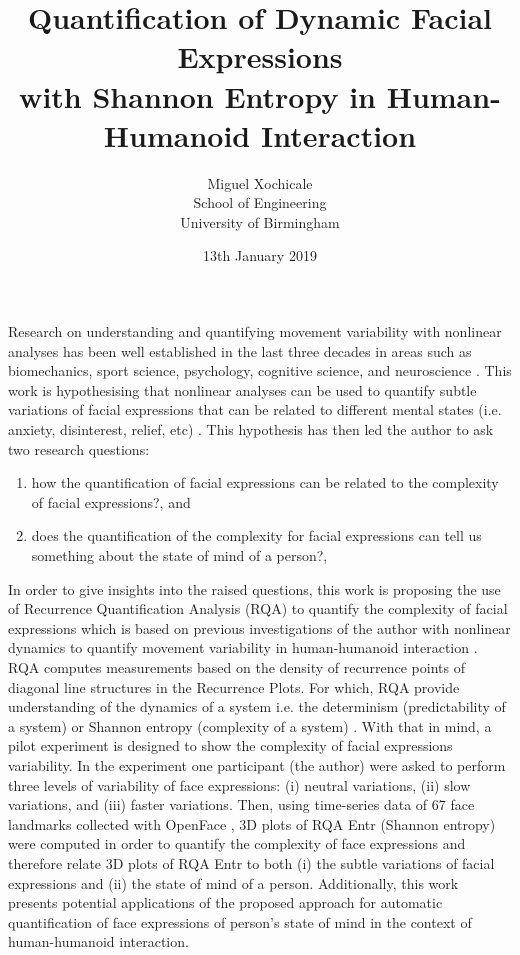 \documentclass[12pt]{article}
\title{
Quantification of Dynamic Facial Expressions \\
with Shannon Entropy
in Human-Humanoid Interaction
}
\author{Miguel Xochicale \\
School of Engineering \\
University of Birmingham}
\date{13th January 2019}
\begin{document}
\maketitle
\thispagestyle{empty} %

Research on understanding and quantifying movement variability 
with nonlinear analyses has been well established in the last three 
decades in areas such as biomechanics, sport science, psychology, 
cognitive science, and neuroscience \cite{davids2003}.
This work is hypothesising that nonlinear analyses 
can be used to quantify subtle variations of facial expressions 
that can be related to different mental states 
(i.e. anxiety, disinterest, relief, etc) \cite{back2014}.
This hypothesis has then led the author to ask two research questions: 
\begin{enumerate}[label=(\roman*)]
\item how the quantification of facial expressions can be related to  
	the complexity of facial expressions?, and 
\item does the quantification of the complexity for facial expressions 
	can tell us something about the state of mind of a person?, 
\end{enumerate}


In order to give insights into the raised questions,
this work is proposing 
the use of Recurrence Quantification Analysis (RQA) 
to quantify the complexity of facial expressions 
which is based on previous investigations of the author 
with nonlinear dynamics to quantify movement variability 
in human-humanoid interaction \cite{XochicalePhDThesis2018}.
RQA computes measurements based on the density of 
recurrence points of diagonal line 
structures in the Recurrence Plots.
For which, RQA provide understanding of the dynamics of a system i.e. 
the determinism (predictability of a system) or 
Shannon entropy (complexity of a system) \cite{marwan2007}.
With that in mind, a pilot experiment is designed 
to show the complexity of facial expressions variability. 
In the experiment one participant (the author) 
were asked to perform 
three levels of variability of face expressions:
(i) neutral variations, (ii) slow variations, and (iii) faster variations.
Then, using time-series data of 67 face landmarks collected 
with OpenFace \cite{baltrusaitis2018}, 3D plots
of RQA Entr (Shannon entropy) were computed in order
to quantify the complexity of face expressions and 
therefore relate 3D plots of RQA Entr 
to both (i) the subtle variations of facial expressions 
and (ii) the state of mind of a person. Additionally,
this work presents potential applications of the proposed 
approach for automatic quantification of face expressions 
of person's state of mind in the context 
of human-humanoid interaction.




\end{document}
